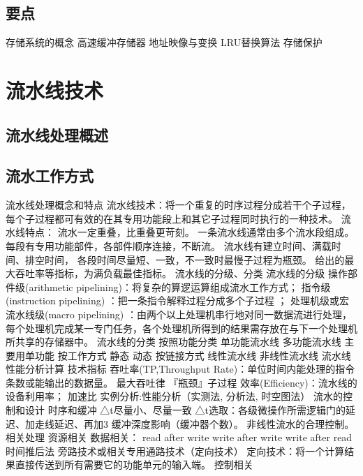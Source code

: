 \documentclass{ctexart}
\begin{document}
\subsection{要点}
\begin{outline}
    \heiti
    \1 存储系统的概念
    \1 高速缓冲存储器
    \1 地址映像与变换
    \1 LRU替换算法
    \1 存储保护
\end{outline}

\section{流水线技术}
\subsection{流水线处理概述}
\subsection{流水工作方式}

\begin{outline}
    \1 流水线处理概念和特点
        \2 流水线技术：将一个重复的时序过程分成若干个子过程，每个子过程都可有效的在其专用功能段上和其它子过程同时执行的一种技术。 
        \2 流水线特点：
            \3 流水一定重叠，比重叠更苛刻。
            \3 一条流水线通常由多个流水段组成。
            \3 每段有专用功能部件，各部件顺序连接，不断流。
            \3 流水线有建立时间、满载时间、排空时间，
            \3 各段时间尽量短、一致，不一致时最慢子过程为瓶颈。
            \3 给出的最大吞吐率等指标，为满负载最佳指标。
    \1 流水线的分级、分类
        \2 流水线的分级
            \3 操作部件级(arithmetic pipelining)：将复杂的算逻运算组成流水工作方式； 
            \3 指令级(instruction pipelining) ：把一条指令解释过程分成多个子过程 ；
            \3 处理机级或宏流水线级(macro pipelining) ：由两个以上处理机串行地对同一数据流进行处理，每个处理机完成某一专门任务，各个处理机所得到的结果需存放在与下一个处理机所共享的存储器中。 
        \2 流水线的分类
            \3 按照功能分类
                \4 单功能流水线
                \4 多功能流水线
                \4 主要用单功能
            \3 按工作方式
                \4 静态
                \4 动态
            \3 按链接方式
                \4 线性流水线
                \4 非线性流水线
    \1 流水线性能分析计算
        \2 技术指标
            \3 吞吐率(TP,Throughput Rate)：单位时间内能处理的指令条数或能输出的数据量。
                \4 最大吞吐律
                \4 『瓶颈』子过程
            \3 效率(Efficiency)：流水线的设备利用率；
            \3 加速比
        \2 实例分析:性能分析（实测法,  分析法,  时空图法）
    \1 流水的控制和设计
        \2 时序和缓冲
            \3 △t尽量小、尽量一致
            \3 △t选取：各级微操作所需逻辑门的延迟、加走线延迟、再加3%
            \3 缓冲深度影响（缓冲器个数）。
            \3 非线性流水的合理控制。
        \2 相关处理
            \3 资源相关
            \3 数据相关：
                \4 read after write
                \4 write after write
                \4 write after read
                \4 时间推后法
                \4 旁路技术或相关专用通路技术（定向技术）
                \4 定向技术：将一个计算结果直接传送到所有需要它的功能单元的输入端。
            \3 控制相关

\end{outline}
\end{document}
